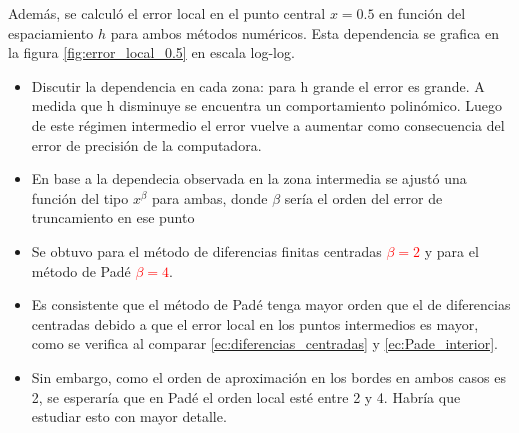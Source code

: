 \documentclass[aps,prb,twocolumn,superscriptaddress,floatfix,longbibliography]{revtex4-2}
\newif\ifptitle
\newif\ifpnumber
\newcounter{para}
\newcommand\ptitle[1]{\par\refstepcounter{para}
{\ifpnumber{\noindent\textcolor{lightgray}{\textbf{\thepara}}\indent}\fi}
{\ifptitle{\textbf{[{#1}]}}\fi}}
\begin{document}
\ptitle{Error en x = 0.5}
Además, se calculó el error local en el punto central $x = 0.5$ en función del espaciamiento $h$ para ambos métodos numéricos. Esta dependencia se grafica en la figura \ref{fig:error_local_0.5} en escala log-log.


\begin{itemize}
    \item Discutir la dependencia en cada zona: para h grande el error es grande. A medida que h disminuye se encuentra un comportamiento polinómico. Luego de este régimen intermedio el error vuelve a aumentar como consecuencia del error de precisión de la computadora.
    \item En base a la dependecia observada en la zona intermedia se ajustó una función del tipo $x^\beta$ para ambas, donde $\beta$ sería el orden del error de truncamiento en ese punto
    \item Se obtuvo para el método de diferencias finitas centradas \textcolor{red}{$\beta = 2$} y para el método de Padé \textcolor{red}{$\beta = 4$}.
    \item Es consistente que el método de Padé tenga mayor orden que el de diferencias centradas debido a que el error local en los puntos intermedios es mayor, como se verifica al comparar \ref{ec:diferencias_centradas} y \ref{ec:Pade_interior}.
    \item Sin embargo, como el orden de aproximación en los bordes en ambos casos es 2, se esperaría que en Padé el orden local esté entre 2 y 4. Habría que estudiar esto con mayor detalle.
\end{itemize}
\end{document}
